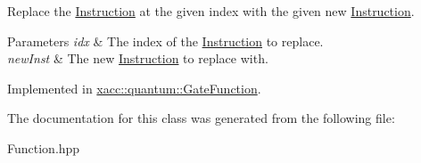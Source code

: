 Replace the \hyperlink{a02460}{Instruction} at the given index with the given new \hyperlink{a02460}{Instruction}.


\begin{DoxyParams}{Parameters}
{\em idx} & The index of the \hyperlink{a02460}{Instruction} to replace. \\
\hline
{\em new\+Inst} & The new \hyperlink{a02460}{Instruction} to replace with. \\
\hline
\end{DoxyParams}


Implemented in \hyperlink{a01272_a182fdfabbf546ae89e4f2384bafb45c9}{xacc\+::quantum\+::\+Gate\+Function}.



The documentation for this class was generated from the following file\+:\begin{DoxyCompactItemize}
\item 
Function.\+hpp\end{DoxyCompactItemize}
